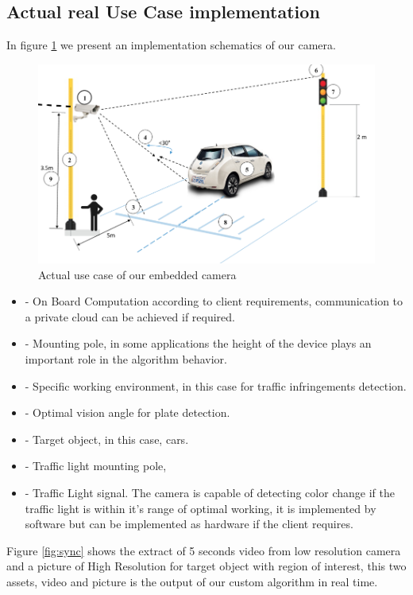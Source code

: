 \subsection{Actual real Use Case implementation}

In figure \ref{fig:work_dec} we present an implementation schematics of our camera.

\begin{figure}[t]\centering
	\includegraphics[width=\linewidth]{images/lucam}
	\caption{Actual use case of our embedded camera}
	\label{fig:work_dec}
\end{figure}

\begin{itemize}[noitemsep] %

\item[1]- On Board Computation according to client requirements, communication to a private cloud can be achieved if required.
\item[2]- Mounting pole, in some applications the height of the device plays an important role in the algorithm behavior.
\item[3-8]- Specific working environment, in this case for traffic infringements detection.
\item[4]- Optimal vision angle for plate detection.
\item[5]- Target object, in this case, cars.
\item[6]- Traffic light mounting pole,
\item[7]- Traffic Light signal. The camera is capable of detecting color change if the traffic light is within it's range of optimal working, it is implemented by software but can be implemented as hardware if the client requires.
\end{itemize}
Figure \ref{fig:sync} shows the extract of 5 seconds video from low resolution camera and a picture of High Resolution for target object with region of interest, this two assets, video and picture is the output of our custom algorithm in real time.

